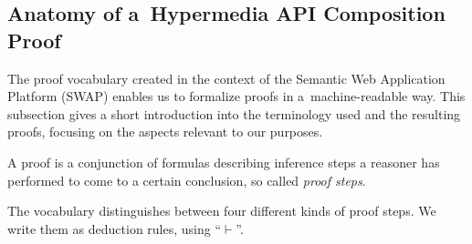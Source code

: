 \subsection{Anatomy of a~Hypermedia API Composition Proof}
\label{sec:ProofAnatomy}
The \nthree proof vocabulary created in the context of the Semantic Web Application Platform (SWAP) \cite{SWAP} enables us to formalize proofs in a~machine-readable way.
This subsection gives a short introduction into the terminology used and the resulting proofs,
focusing on the aspects relevant to our purposes.

A proof is a conjunction of \nthree formulas describing 
inference steps
a reasoner has performed to come to a certain conclusion, so called \textit{proof steps}. 




The vocabulary distinguishes between four different kinds of proof steps. We write them as deduction rules, using ``$\vdash$''.


